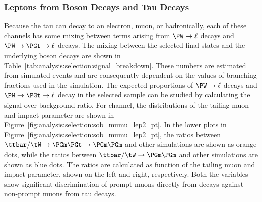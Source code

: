 \subsubsection{Leptons from Boson Decays and Tau Decays} 
Because the tau can decay to an electron, muon, or hadronically, each of these channels has some mixing between terms arising from $\PW\rightarrow\ell$ decays and $\PW\rightarrow\PGt\rightarrow\ell$ decays.  The mixing between the selected final states and the underlying \PW boson decays are shown in Table~\ref{tab:analysis:selection:signal_breakdown}. These numbers are estimated from simulated \ttbar events and are consequently dependent on the values of branching fractions used in the simulation. The expected proportions of $\PW\rightarrow\ell$ decays and $\PW\rightarrow\PGt\rightarrow\ell$ decay in the selected sample can be studied by calculating the signal-over-background ratio. For \cmm channel, the distributions of the tailing muon \pt and impact parameter are shown in Figure~\ref{fig:analysis:selection:sob_mumu_lep2_pt}. In the lower plots in Figure~\ref{fig:analysis:selection:sob_mumu_lep2_pt}, the ratios between $\ttbar/\tW \to \PGm \PGt \to \PGm \PGm$ and other simulations are shown as orange dots, while the ratios between $\ttbar/\tW \to \PGm \PGm$ and other simulations are shown as blue dots. The ratios are calculated as function of the tailing muon \pt and impact parameter, shown on the left and right, respectively. Both the variables show significant discrimination of prompt muons directly from \PW decays against non-prompt muons from tau decays.

